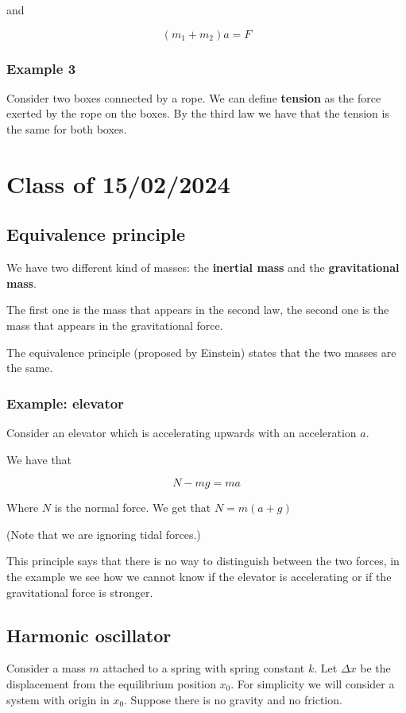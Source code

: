 \documentclass[10pt]{extarticle}
\begin{document}
and

$$
  (m_1 + m_2) a = F
$$

\subsubsection{Example 3}

Consider two boxes connected by a rope.
We can define \textbf{tension} as the force exerted by the rope on the boxes.
By the third law we have that the tension is the same for both boxes.

\section{Class of 15/02/2024}

\subsection{Equivalence principle}

We have two different kind of masses: the \textbf{inertial mass} and the \textbf{gravitational mass}.

The first one is the mass that appears in the second law, the second one is the mass that appears in the gravitational force.

The equivalence principle (proposed by Einstein) states that the two masses are the same.

\subsubsection{Example: elevator}

Consider an elevator which is accelerating upwards with an acceleration $a$.

We have that

$$
  N - m g = m a
$$

Where $N$ is the normal force. We get that $N = m(a + g)$

(Note that we are ignoring tidal forces.)

This principle says that there is no way to distinguish between the two forces, in the example we see how we cannot know if the elevator is accelerating or if the gravitational force is stronger.

\subsection{Harmonic oscillator}

Consider a mass $m$ attached to a spring with spring constant $k$. Let $\Delta x$ be the displacement from the equilibrium position $x_0$. For simplicity we will consider a system with origin in $x_0$. Suppose there is no gravity and no friction.
\end{document}
